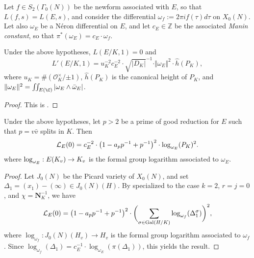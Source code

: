Let $f\in S_2(\Gamma_0(N))$ be the newform associated with $E$, so that $L(f,s)=L(E,s)$, and consider the differential $\omega_f:=2\pi i f(\tau)d\tau$ on $X_0(N)$. Let also $\omega_E$ be a N\'{e}ron differential on $E$, and let $c_E\in\mathbb{Z}$ be the associated \emph{Manin constant}, so that $\pi^*(\omega_E)=c_E\cdot\omega_f$.

\begin{theorem}
\notready
\label{thmGZ}
Under the above hypotheses, $L(E/K,1)=0$ and
\begin{displaymath}
L'(E/K,1)=u_K^{-2}c_E^{-2}\cdot\sqrt{\vert D_K\vert}^{-1}\cdot\Vert \omega_E \Vert^2\cdot \hat{h}(P_K),
\end{displaymath}
where $u_K=\#(\mathcal{O}_K^\times/{\pm{1}})$, %
$\hat{h}(P_K)$ is the canonical height of $P_K$, and $\Vert\omega_E\Vert^2=\iint_{E(\C)}|\omega_E \wedge \bar{\omega}_E|$.
\end{theorem}

\begin{proof}
This is \cite[Thm.~V.2.1]{grosszagier}.
\end{proof}

\begin{theorem}
\notready
\label{thmpadicGZ}
Under the above hypotheses, let $p>2$ be a prime of good reduction for $E$ such that $p=v\bar{v}$ splits in $K$. Then
\[
\mathcal{L}_E(0)=c_E^{-2}\cdot\bigl(1-a_pp^{-1}+p^{-1}\bigr)^2\cdot{\rm log}_{\omega_E}(P_K)^2.
\]
where ${\rm log}_{\omega_E}:E(K_v)\rightarrow K_v$ is the formal group logarithm associated to $\omega_E$.
\end{theorem}

\begin{proof}
Let $J_0(N)$ be the Picard variety of $X_0(N)$, and set $\Delta_1=(x_1)-(\infty)\in J_0(N)(H)$.
By \cite[Thm.~5.13]{BDP} specialized to the case $k=2$, $r=j=0$, and $\chi=\mathbf{N}_K^{-1}$, we have
\[
\mathcal{L}_E(0)=\bigl(1-a_pp^{-1}+p^{-1}\bigr)^2\cdot\biggl(\sum_{\sigma\in{\rm Gal}(H/K)}\log_{\omega_f}(\Delta_1^\sigma)\biggr)^2,
\]
where $\log_{\omega_f}:J_0(N)(H_v)\rightarrow H_v$ is the formal group logarithm associated to $\omega_f$. Since $\log_{\omega_f}(\Delta_1)=%
c_E^{-1}\cdot\log_{\omega_E}(\pi(\Delta_1))$, this yields the result.
\end{proof}



